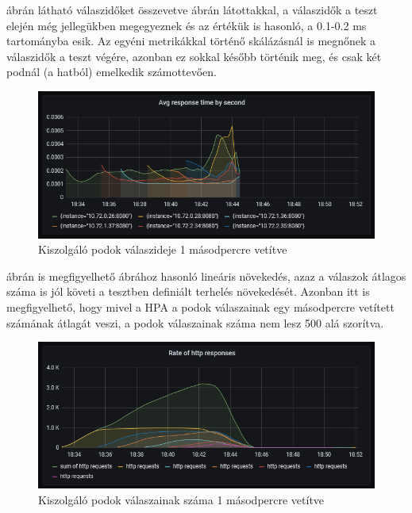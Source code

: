 \documentclass[a4paper,oneside]{article}
\begin{document}
 ábrán látható válaszidőket összevetve
 ábrán látottakkal, a válaszidők a teszt elején
még jellegükben megegyeznek és az értékük is hasonló, a 0.1-0.2 ms tartományba
esik.  Az egyéni metrikákkal történő skálázásnál is megnőnek a válaszidők a
teszt végére,  azonban ez sokkal később történik meg, és csak két podnál (a
hatból) emelkedik számottevően.

\begin{figure}[H]
  \centering
  \includegraphics[width=\textwidth]{light_custom_response_time.PNG}
  \caption{Kiszolgáló podok válaszideje 1 másodpercre vetítve}
  \label{light_custom_response_time}  
\end{figure}

 ábrán is megfigyelhető
 ábrához hasonló lineáris növekedés, azaz a válaszok
átlagos száma is jól követi a tesztben definiált terhelés növekedését.
Azonban itt is megfigyelhető, hogy mivel a HPA a podok válaszainak egy
másodpercre vetített számának átlagát veszi, a podok válaszainak száma nem
lesz 500 alá szorítva.

\begin{figure}[H]
  \centering
  \includegraphics[width=\textwidth]{light_custom_response_count.PNG}
  \caption{Kiszolgáló podok válaszainak száma 1 másodpercre vetítve}
  \label{light_custom_response_count}  
\end{figure}
\end{document}
